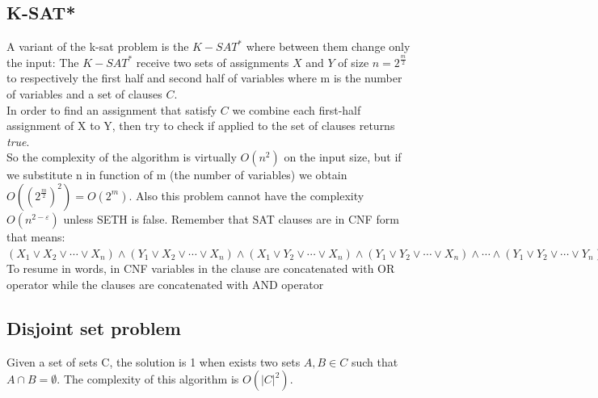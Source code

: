 \subsection{K-SAT*}
A variant of the k-sat problem is the $ K-SAT^* $ where between them change only the input: The $ K-SAT^* $ receive two sets of assignments $ X  $ and $ Y$ of size $ n = 2^{\frac{m}{2}} $ to respectively the first half and second half of variables where m is the number of variables and a set of clauses $ C $.\\
In order to find an assignment that satisfy $ C $ we combine each first-half assignment of X to Y, then try to check if applied to the set of clauses returns \textit{true}.\\
So the complexity of the algorithm is virtually $ O(n^2) $ on the input size, but if we substitute n in function of m (the number of variables) we obtain $ O((2^{\frac{m}{2}})^2)  = O(2^m)$. Also this problem cannot have the complexity $ O(n^{2-\varepsilon}) $ unless SETH is false.
Remember that SAT clauses are in CNF form that means:\\ \medskip
\noindent
$ (X_{1}\vee X_{2}\vee \cdots \vee X_{n})\wedge (Y_{1}\vee X_{2}\vee \cdots \vee X_{n})\wedge (X_{1}\vee Y_{2}\vee \cdots \vee X_{n})\wedge (Y_{1}\vee Y_{2}\vee \cdots \vee X_{n})\wedge \cdots \wedge (Y_{1}\vee Y_{2}\vee \cdots \vee Y_{n}). $\\
To resume in words, in CNF  variables in the clause are concatenated with OR operator while the clauses are concatenated with AND operator
\subsection{Disjoint set problem}
Given a set of sets C, the solution is 1 when exists two sets $ A,B \in C $ such that $ A \cap B = \emptyset $.
The complexity of this algorithm is $ O(|C|^2) $.
